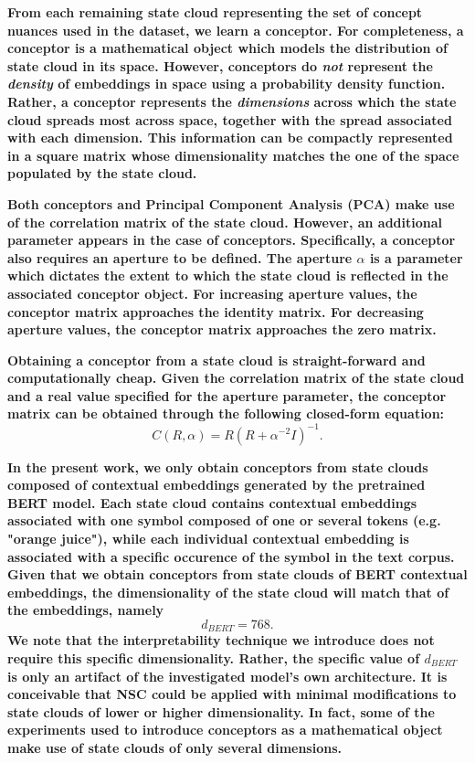\textbf{From each remaining state cloud representing the set of concept nuances used in the dataset, we learn a conceptor. For completeness, a conceptor is a mathematical object which models the distribution of state cloud in its space. However, conceptors do \textit{not} represent the \textit{density} of embeddings in space using a probability density function. Rather, a conceptor represents the \textit{dimensions} across which the state cloud spreads most across space, together with the spread associated with each dimension. This information can be compactly represented in a square matrix whose dimensionality matches the one of the space populated by the state cloud.}

\textbf{Both conceptors and Principal Component Analysis (PCA) make use of the correlation matrix of the state cloud. However, an additional parameter appears in the case of conceptors. Specifically, a conceptor also requires an aperture to be defined. The aperture $\alpha$ is a parameter which dictates the extent to which the state cloud is reflected in the associated conceptor object. For increasing aperture values, the conceptor matrix approaches the identity matrix. For decreasing aperture values, the conceptor matrix approaches the zero matrix.}

\textbf{Obtaining a conceptor from a state cloud is straight-forward and computationally cheap. Given the correlation matrix of the state cloud and a real value specified for the aperture parameter, the conceptor matrix can be obtained through the following closed-form equation:$$C(R, \alpha) = R (R + \alpha^{-2} I)^{-1}.$$}

\textbf{In the present work, we only obtain conceptors from state clouds composed of contextual embeddings generated by the pretrained BERT model. Each state cloud contains contextual embeddings associated with one symbol composed of one or several tokens (e.g. "orange juice"), while each individual contextual embedding is associated with a specific occurence of the symbol in the text corpus. Given that we obtain conceptors from state clouds of BERT contextual embeddings, the dimensionality of the state cloud will match that of the embeddings, namely $$d_{BERT}=768.$$ We note that the interpretability technique we introduce does not require this specific dimensionality. Rather, the specific value of $d_{BERT}$ is only an artifact of the investigated model's own architecture. It is conceivable that NSC could be applied with minimal modifications to state clouds of lower or higher dimensionality. In fact, some of the experiments used to introduce conceptors as a mathematical object make use of state clouds of only several dimensions.}


